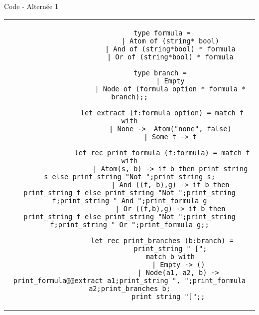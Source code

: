 \documentclass[]{beamer}
\begin{document}
\begin{frame}[fragile]{Code - Alternée 1}
    \begin{center}
        \begin{tabular}{c}
            \begin{lstlisting}
                type formula =
                    | Atom of (string* bool)
                    | And of (string*bool) * formula
                    | Or of (string*bool) * formula

                type branch = 
                    | Empty
                    | Node of (formula option * formula * branch);;

                let extract (f:formula option) = match f with
                    | None ->  Atom("none", false)
                    | Some t -> t

                let rec print_formula (f:formula) = match f with
                    | Atom(s, b) -> if b then print_string s else print_string "Not ";print_string s;
                    | And ((f, b),g) -> if b then print_string f else print_string "Not ";print_string f;print_string " And ";print_formula g
                    | Or ((f,b),g) -> if b then print_string f else print_string "Not ";print_string f;print_string " Or ";print_formula g;;

                let rec print_branches (b:branch) =
                    print_string " [";
                    match b with
                        | Empty -> ()
                        | Node(a1, a2, b) -> print_formula@@extract a1;print_string ", ";print_formula a2;print_branches b;
                    print_string "]";; 
            \end{lstlisting}
        \end{tabular}
    \end{center}   
\end{frame}
\end{document}
